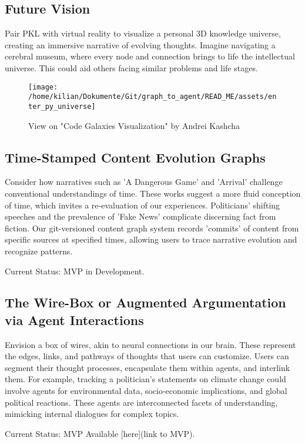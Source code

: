 \documentclass[11pt, a4paper]{article}
\begin{document}
    \begin{gitbox}
        \section*{Future Vision}
        Pair PKL with virtual reality to visualize a personal 3D knowledge universe, creating an immersive narrative of evolving thoughts. Imagine navigating a cerebral museum, where every node and connection brings to life the intellectual universe. This could aid others facing similar problems and life stages.
    \end{gitbox}
    \begin{figure}
        \centering
        \texttt{[image: /home/kilian/Dokumente/Git/graph\_to\_agent/READ\_ME/assets/enter\_py\_universe]}
        \caption{View on "Code Galaxies Visualization" by Andrei Kashcha}
        \label{fig:}
    \end{figure}

    \begin{gitbox}
        \section*{Time-Stamped Content Evolution Graphs}
        Consider how narratives such as 'A Dangerous Game' and 'Arrival' challenge conventional understandings of time. These works suggest a more fluid conception of time, which invites a re-evaluation of our experiences. Politicians’ shifting speeches and the prevalence of 'Fake News' complicate discerning fact from fiction. Our git-versioned content graph system records 'commits' of content from specific sources at specified times, allowing users to trace narrative evolution and recognize patterns.

        Current Status: MVP in Development.
    \end{gitbox}

    \begin{gitbox}
        \section*{The Wire-Box or Augmented Argumentation via Agent Interactions}
        Envision a box of wires, akin to neural connections in our brain. These represent the edges, links, and pathways of thoughts that users can customize. Users can segment their thought processes, encapsulate them within agents, and interlink them. For example, tracking a politician's statements on climate change could involve agents for environmental data, socio-economic implications, and global political reactions. These agents are interconnected facets of understanding, mimicking internal dialogues for complex topics.


        Current Status: MVP Available [here](link to MVP).
    \end{gitbox}
\end{document}
